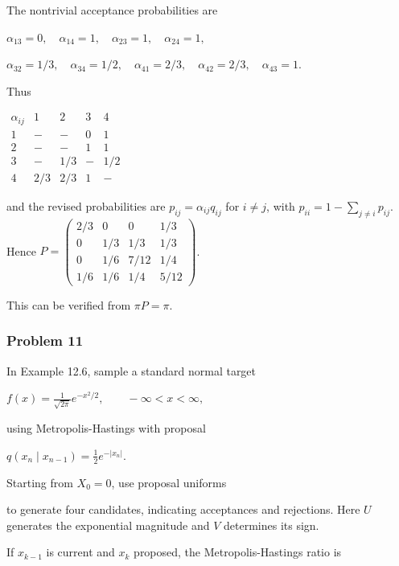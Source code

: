 The nontrivial acceptance probabilities are

$\alpha_{13}=0,\quad\alpha_{14}=1,\quad\alpha_{23}=1,\quad\alpha_{24}=1,$

$\alpha_{32}=1/3,\quad\alpha_{34}=1/2,\quad\alpha_{41}=2/3,\quad\alpha_{42}=2/3,\quad\alpha_{43}=1$.

Thus

$\begin{array}{c|cccc}\alpha_{ij}&1&2&3&4\\\hline1&-&-&0&1\\2&-&-&1&1\\3&-&1/3&-&1/2\\4&2/3&2/3&1&-\end{array}$

and the revised probabilities are $p_{ij}=\alpha_{ij}q_{ij}$ for $i\neq j$, with $p_{ii}=1-\sum_{j\neq i}p_{ij}$. Hence
$P=\begin{pmatrix}2/3&0&0&1/3\\0&1/3&1/3&1/3\\0&1/6&7/12&1/4\\1/6&1/6&1/4&5/12\end{pmatrix}$.

This can be verified from $\pi P=\pi$.

\subsubsection*{Problem 11}

 In Example 12.6, sample a standard normal target

$f(x)=\frac1{\sqrt{2\pi}}e^{-x^2/2},\qquad -\infty<x<\infty,$

using Metropolis-Hastings with proposal

$q(x_n\mid x_{n-1})=\frac12e^{-|x_n|}$.

Starting from $X_0=0$, use proposal uniforms

\noindent{}

to generate four candidates, indicating acceptances and rejections. Here $U$ generates the exponential magnitude and $V$ determines its sign.

 If $x_{k-1}$ is current and $x_k$ proposed, the Metropolis-Hastings ratio is

